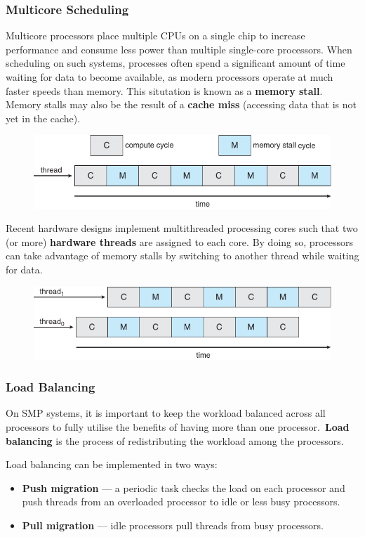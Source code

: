 \documentclass{article}
\begin{document}
\subsubsection{Multicore Scheduling}
Multicore processors place multiple CPUs on a single chip to increase
performance and consume less power than multiple single-core processors.
When scheduling on such systems, processes often spend a significant
amount of time waiting for data to become available, as modern
processors operate at much faster speeds than memory. This situtation is
known as a \textbf{memory stall}. Memory stalls may also be the result
of a \textbf{cache miss} (accessing data that is not yet in the cache).
\begin{figure}[H]
    \centering
    \includegraphics[width = 0.8\linewidth]{figures/memory_stall.pdf}
\end{figure}
Recent hardware designs implement multithreaded processing cores such
that two (or more) \textbf{hardware threads} are assigned to each core.
By doing so, processors can take advantage of memory stalls by switching
to another thread while waiting for data.
\begin{figure}[H]
    \centering
    \includegraphics[width = 0.8\linewidth]{figures/memory_stall_2.pdf}
\end{figure}
\subsubsection{Load Balancing}
On SMP systems, it is important to keep the workload balanced across
all processors to fully utilise the benefits of having more than one
processor.\ \textbf{Load balancing} is the process of redistributing
the workload among the processors.

Load balancing can be implemented in two ways:
\begin{itemize}
    \item \textbf{Push migration} --- a periodic task checks the load on
          each processor and push threads from an overloaded processor to
          idle or less busy processors.
    \item \textbf{Pull migration} --- idle processors pull threads from
          busy processors.
\end{itemize}
\end{document}
